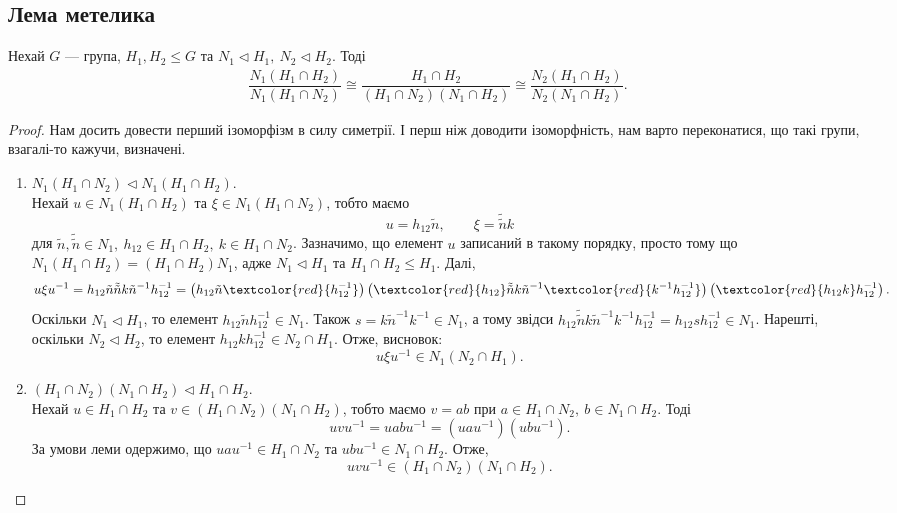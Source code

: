 \documentclass{math_library}
\begin{document}
\subsection{Лема метелика}
\begin{lemma}
Нехай $G$ --- група, $H_1,H_2 \leq G$ та $N_1 \triangleleft H_1,\ N_2 \triangleleft H_2$. Тоді
\begin{align*}
\dfrac{N_1 (H_1 \cap H_2)}{N_1(H_1 \cap N_2)} \cong \dfrac{H_1 \cap H_2}{(H_1 \cap N_2) (N_1 \cap H_2)} \cong \dfrac{N_2(H_1 \cap H_2)}{N_2(N_1 \cap H_2)}.
\end{align*}
\end{lemma}

\begin{proof}
Нам досить довести перший ізоморфізм в силу симетрії. І перш ніж доводити ізоморфність, нам варто переконатися, що такі групи, взагалі-то кажучи, визначені.

\begin{enumerate}[wide=0pt,label={\Roman*.}]
\item $N_1 (H_1 \cap N_2) \triangleleft N_1(H_1 \cap H_2)$.\\
Нехай $u \in N_1(H_1 \cap H_2)$ та $\xi \in N_1(H_1 \cap N_2)$, тобто маємо
\[
u = h_{12} \tilde{n}, \qquad \xi = \tilde{\tilde{n}} k
\]
для $\tilde{n}, \tilde{\tilde{n}} \in N_1,\ h_{12} \in H_1 \cap H_2,\ k \in H_1 \cap N_2$. Зазначимо, що елемент $u$ записаний в такому порядку, просто тому що $N_1(H_1 \cap H_2) = (H_1 \cap H_2) N_1$, адже $N_1 \triangleleft H_1$ та $H_1 \cap H_2 \leq H_1$. Далі,
\[
u \xi u^{-1} = h_{12} \tilde{n} \tilde{\tilde{n}} k \tilde{n}^{-1} h_{12}^{-1} = \left( h_{12} \tilde{n} \textcolor{red}{h_{12}^{-1}} \right) \left( \textcolor{red}{h_{12}} \tilde{\tilde{n}} k \tilde{n}^{-1} \textcolor{red}{k^{-1} h_{12}^{-1}} \right) \left( \textcolor{red}{h_{12} k} h_{12}^{-1} \right).
\]
Оскільки $N_1 \triangleleft H_1$, то елемент $h_{12} \tilde{n} h_{12}^{-1} \in N_1$. Також $s = k \tilde{n}^{-1} k^{-1} \in N_1$, а тому звідси $h_{12} \tilde{\tilde{n}} k \tilde{n}^{-1} k^{-1} h_{12}^{-1} = h_{12} s h_{12}^{-1} \in N_1$. Нарешті, оскільки $N_2 \triangleleft H_2$, то елемент $h_{12} k h_{12}^{-1} \in N_2 \cap H_1$. Отже, висновок:
\[
u \xi u^{-1} \in N_1 (N_2 \cap H_1).
\]

\item $(H_1 \cap N_2) (N_1 \cap H_2) \triangleleft H_1 \cap H_2$.\\
Нехай $u \in H_1 \cap H_2$ та $v \in (H_1 \cap N_2)(N_1 \cap H_2)$, тобто маємо $v = ab$ при $a \in H_1 \cap N_2,\ b \in N_1 \cap H_2$. Тоді
\[
uvu^{-1} = uabu^{-1} = (uau^{-1})(ubu^{-1}).
\]
За умови леми одержимо, що $uau^{-1} \in H_1 \cap N_2$ та $ubu^{-1} \in N_1 \cap H_2$. Отже,
\[
uvu^{-1} \in (H_1 \cap N_2)(N_1 \cap H_2).
\]


\end{enumerate}
\end{proof}
\end{document}
